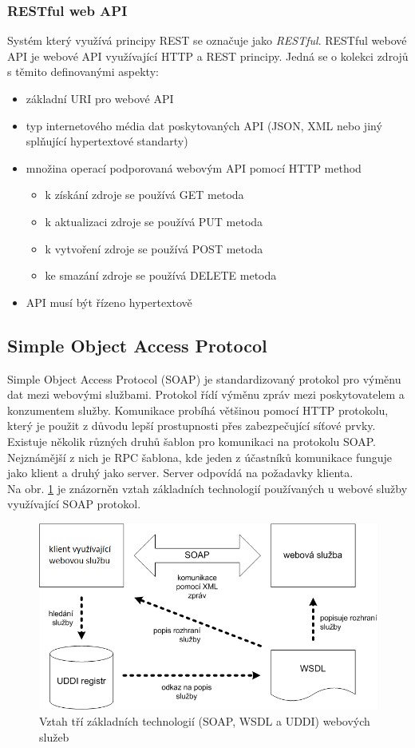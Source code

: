 \documentclass{diplomka}
\begin{document}
\subsubsection*{RESTful web API}
Systém který využívá principy REST se označuje jako \emph{RESTful}. RESTful webové API je webové API využívající HTTP a REST principy. Jedná se o kolekci zdrojů s těmito definovanými aspekty: 
\begin{itemize}
\item základní URI pro webové API
\item typ internetového média dat poskytovaných API (JSON, XML nebo jiný splňující hypertextové standarty)
\item množina operací podporovaná webovým API pomocí HTTP method
\begin{itemize}
\item k získání zdroje se používá GET metoda
\item k aktualizaci zdroje se používá PUT metoda
\item k vytvoření zdroje se používá POST metoda
\item ke smazání zdroje se používá DELETE metoda
\end{itemize}
\item API musí být řízeno hypertextově
\end{itemize}

\subsection{Simple Object Access Protocol}
Simple Object Access Protocol (SOAP) je standardizovaný protokol pro výměnu dat mezi webovými službami. Protokol řídí výměnu zpráv mezi poskytovatelem a konzumentem služby. Komunikace probíhá většinou pomocí HTTP protokolu, který je použit z důvodu lepší prostupnosti přes zabezpečující síťové prvky.\\ \indent
Existuje několik různých druhů šablon pro komunikaci na protokolu SOAP. Nejznámější z nich je RPC šablona, kde jeden z účastníků komunikace funguje jako klient a druhý jako server. Server odpovídá na požadavky klienta.\\ \indent
Na obr. \ref{fig:soap} je znázorněn vztah základních technologií používaných u webové služby využívající SOAP protokol.
\begin{figure}[H]
  \centering
  \includegraphics[scale=0.8]{obr/komunikace-webservices.png}
\caption{Vztah tří základních technologií (SOAP, WSDL a UDDI) webových služeb\cite{websluzby}}
\label{fig:soap}
\end{figure}
\end{document}
